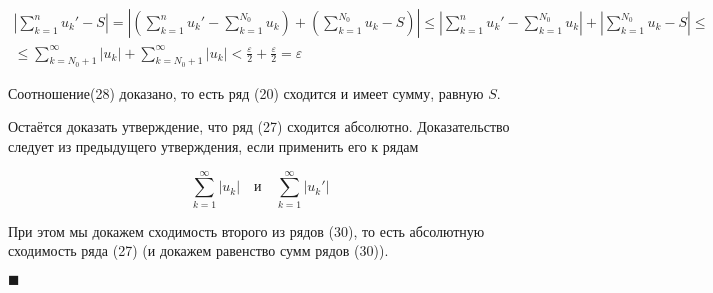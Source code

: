 \begin{equation*}
	\begin{gathered}
		\left| \displaystyle\sum_{k = 1}^n u_k' - S \right| = \left| \left( \displaystyle\sum_{k = 1}^n u_k' - \displaystyle\sum_{k = 1}^{N_0} u_k \right) + \left( \displaystyle\sum_{k = 1}^{N_0} u_k - S \right) \right| \leqslant \left| \displaystyle\sum_{k = 1}^n u_k' - \displaystyle\sum_{k = 1}^{N_0} u_k \right| + \left| \displaystyle\sum_{k = 1}^{N_0} u_k - S \right| \leqslant \\
		\leqslant \displaystyle\sum_{k = N_0 + 1}^\infty |u_k| + \displaystyle\sum_{k = N_0 + 1}^\infty |u_k| < \frac{\varepsilon}{2} + \frac{\varepsilon}{2} = \varepsilon
	\end{gathered}
\end{equation*}

Соотношение(28) доказано, то есть ряд (20) сходится и имеет сумму, равную $S$.

Остаётся доказать утверждение, что ряд (27) сходится абсолютно. Доказательство следует из предыдущего утверждения, если применить его к рядам

\begin{equation}
	\displaystyle\sum_{k = 1}^\infty |u_k|\quad \mbox{и} \quad \displaystyle\sum_{k = 1}^\infty |u_k'|
\end{equation}

При этом мы докажем сходимость второго из рядов (30), то есть абсолютную сходимость ряда (27) (и докажем равенство сумм рядов (30)).

\begin{flushright}
	$\blacksquare$
\end{flushright}